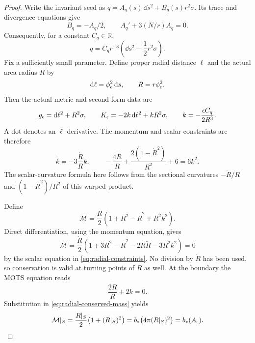 \begin{proof}
Write the invariant seed as
$q=A_q(s)\,\dd s^2+B_q(s)r^2\sigma$.
Its trace and divergence equations give
\[
 B_q=-A_q/2,
 \qquad A_q'+3(N/r)A_q=0.
\]
Consequently, for a constant $C_q\in\mathbb R$,
\begin{equation}
 q=C_qr^{-3}\left(\dd s^2-\frac12r^2\sigma\right).
 \label{eq:radial-tt-tensor}
\end{equation}
Fix a sufficiently small parameter.  Define proper radial distance
$\ell$ and the actual area radius $R$ by
\[
 \mathrm{d}\ell=\phi_\epsilon^2\,\mathrm{d} s,
 \qquad R=r\phi_\epsilon^2.
\]
Then the actual metric and second-form data are
\[
 g_\epsilon=\mathrm{d}\ell^2+R^2\sigma,
 \qquad K_\epsilon=-2k\,\mathrm{d}\ell^2+kR^2\sigma,
 \qquad k=-\frac{\epsilon C_q}{2R^3}.
\]
A dot denotes an $\ell$-derivative.  The momentum and scalar constraints
are therefore
\begin{equation}
 \dot k=-3\frac{\dot R}{R}k,
 \qquad
 -\frac{4\ddot R}{R}
 +\frac{2(1-\dot R^2)}{R^2}+6=6k^2.
 \label{eq:radial-constraints}
\end{equation}
The scalar-curvature formula here follows from the sectional curvatures
$-\ddot R/R$ and $(1-\dot R^2)/R^2$ of this warped product.

Define
\begin{equation}
 \mathcal M
 =\frac R2\left(1+R^2-\dot R^2+R^2k^2\right).
 \label{eq:radial-conserved-mass}
\end{equation}
Direct differentiation, using the momentum equation, gives
\[
 \dot{\mathcal M}
 =\frac{\dot R}{2}
 \left(1+3R^2-\dot R^2-2R\ddot R-3R^2k^2\right)=0
\]
by the scalar equation in \eqref{eq:radial-constraints}.
No division by $\dot R$ has been used, so conservation is valid at
turning points of $R$ as well.
At the boundary the MOTS equation reads
\[
 \frac{2\dot R}{R}+2k=0.
\]
Substitution in \eqref{eq:radial-conserved-mass} yields
\begin{equation}
 \mathcal M|_S
 =\frac{R|_S}{2}\bigl(1+(R|_S)^2\bigr)
 =b_*\bigl(4\pi(R|_S)^2\bigr)=b_*(A_\epsilon).
 \label{eq:radial-mass-at-boundary}
\end{equation}


\end{proof}
